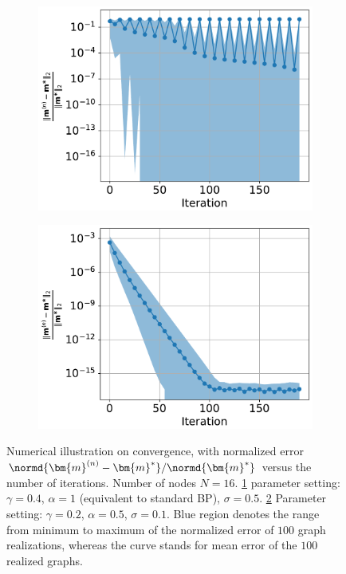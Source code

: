 \begin{figure}[!t]
  \begin{subfigure}{0.5\textwidth}
    \includegraphics[width=1\columnwidth]
    {figures/converge/converge_erp0_4_alpha_1_stn_0_5_vs_filter_false_crop.pdf}
    \caption{}
    \label{fig:log-error-iter-diverse}
  \end{subfigure}
  \begin{subfigure}{0.5\textwidth}
    \includegraphics[width=1\columnwidth]{figures/converge/converge_erp0_2_alpha_0_5_stn_0_1_vs_filter_true-crop.pdf}
    \caption{}
    \label{fig:log-error-iter-converge}
  \end{subfigure}
  \caption{Numerical illustration on convergence, with normalized error ${\normd{\bm{m}^{(n)}-\bm{m}^{\ast}}}/{\normd{\bm{m}^{\ast}}}$ versus the number of iterations. Number of nodes $N=16$. \ref{fig:log-error-iter-diverse} parameter setting: $\gamma =0.4$, $\alpha = 1$ (equivalent to standard BP), $\sigma = 0.5$. \ref{fig:log-error-iter-converge} Parameter setting: $\gamma =0.2$, $\alpha = 0.5$, $\sigma = 0.1$.
    Blue region denotes the range from minimum to maximum of the normalized error of $100$ graph realizations, whereas the curve stands for mean error of the $100$ realized graphs. }
  \label{fig:convergence}
\end{figure}



